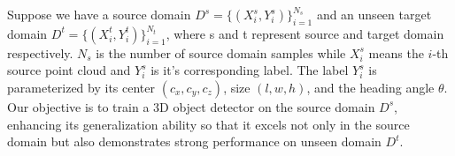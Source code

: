 Suppose we have a source domain $D^{s} = \{(X^{s}_{i}, Y^{s}_{i})\}_{i=1}^{N_{s}}$ and an unseen target domain $D^{t} = \{(X^{t}_{i}, Y^{t}_{i})\}_{i=1}^{N_{t}}$, where s and t represent source and target domain respectively. $N_{s}$ is the number of source domain samples while $X^{s}_{i}$ means the $i$-th source point cloud and $Y^{s}_{i}$ is it's corresponding label. The label $Y^{s}_{i}$ is parameterized by its center $(c_{x}, c_{y}, c_{z})$, size $(l, w, h)$, and the heading angle $\theta$. Our objective is to train a 3D object detector on the source domain $D^{s}$, enhancing its generalization ability so that it excels not only in the source domain but also demonstrates strong performance on unseen domain $D^{t}$.